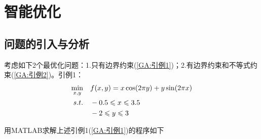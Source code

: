 
\chapter{智能优化}

\section{问题的引入与分析}
    考虑如下2个最优化问题：1.只有边界约束(\ref{GA:引例1})；2.有边界约束和不等式约束(\ref{GA:引例2})。引例1：
    \begin{align}
    \label{GA:引例1}
    \mathop{\min}\limits_{x,y}\quad &f(x,y)=x \cos(2\pi y)+y \sin(2\pi x)\\
    s.t.\quad &  -0.5\leqslant x\leqslant 3.5 \notag\\
    & -2\leqslant y\leqslant 3 \notag
    \end{align}
    \par
    用MATLAB求解上述引例1(\ref{GA:引例1})的程序如下

